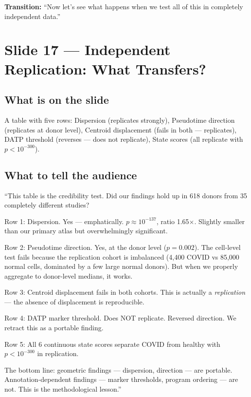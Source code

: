 \documentclass[11pt]{article}
\begin{document}
\textbf{Transition:} ``Now let's see what happens when we test all of this in completely independent data.''


\section{Slide 17 --- Independent Replication: What Transfers?}

\subsection{What is on the slide}

A table with five rows: Dispersion (replicates strongly), Pseudotime direction (replicates at donor level), Centroid displacement (fails in both --- replicates), DATP threshold (reverses --- does not replicate), State scores (all replicate with $p < 10^{-300}$).

\subsection{What to tell the audience}

\begin{speaknote}
``This table is the credibility test. Did our findings hold up in 618 donors from 35 completely different studies?

Row 1: Dispersion. Yes --- emphatically. $p \approx 10^{-137}$, ratio 1.65$\times$. Slightly smaller than our primary atlas but overwhelmingly significant.

Row 2: Pseudotime direction. Yes, at the donor level ($p = 0.002$). The cell-level test fails because the replication cohort is imbalanced (4,400 COVID vs 85,000 normal cells, dominated by a few large normal donors). But when we properly aggregate to donor-level medians, it works.

Row 3: Centroid displacement fails in both cohorts. This is actually a \emph{replication} --- the absence of displacement is reproducible.

Row 4: DATP marker threshold. Does NOT replicate. Reversed direction. We retract this as a portable finding.

Row 5: All 6 continuous state scores separate COVID from healthy with $p < 10^{-300}$ in replication.

The bottom line: geometric findings --- dispersion, direction --- are portable. Annotation-dependent findings --- marker thresholds, program ordering --- are not. This is the methodological lesson.''
\end{speaknote}
\end{document}
